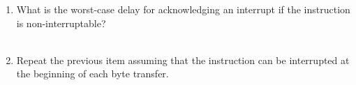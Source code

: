 \documentclass[12pt]{article}
\begin{document}
\begin{enumerate}[itemsep=3em]
\begin{enumerate}[itemsep=3em]
			\item{What is the worst-case delay for acknowledging an interrupt if the instruction is non-interruptable?}\\ \\
			\fbox{\parbox{\linewidth}{
			
			}}
		
			\item{Repeat the previous item assuming that the instruction can be interrupted at the beginning of each byte transfer.}\\ \\
			\fbox{\parbox{\linewidth}{
			
			}}

		\end{enumerate}
	\end{enumerate}
\end{document}
